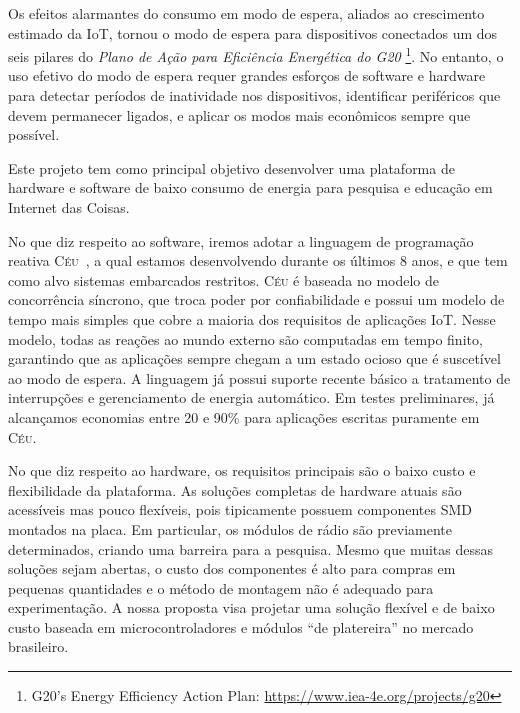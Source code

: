 \documentclass[titlepage,12pt]{article}
\newcommand{\CEU}{\textsc{C\'{e}u}\xspace}
\begin{document}
Os efeitos alarmantes do consumo em modo de espera, aliados ao crescimento
estimado da IoT, tornou o modo de espera para dispositivos conectados um dos
seis pilares do \emph{Plano de Ação para Eficiência Energética do G20}%
\footnote{G20's Energy Efficiency Action Plan: \url{https://www.iea-4e.org/projects/g20}}.
No entanto, o uso efetivo do modo de espera requer grandes esforços de software
e hardware para detectar períodos de inatividade nos dispositivos, identificar
periféricos que devem permanecer ligados, e aplicar os modos mais econômicos
sempre que possível.

Este projeto tem como principal objetivo desenvolver uma plataforma de hardware
e software de baixo consumo de energia para pesquisa e educação em Internet das
Coisas.

No que diz respeito ao software, iremos adotar a linguagem de programação
reativa \CEU~\cite{ceu.sensys13}, a qual estamos desenvolvendo durante os
últimos 8 anos, e que tem como alvo sistemas embarcados restritos.
%
\CEU é baseada no modelo de concorrência síncrono, que troca poder por
confiabilidade e possui um modelo de tempo mais simples que cobre a maioria dos
requisitos de aplicações IoT.
%
Nesse modelo, todas as reações ao mundo externo são computadas em tempo finito,
garantindo que as aplicações sempre chegam a um estado ocioso que é suscetível
ao modo de espera.
%
A linguagem já possui suporte recente básico a tratamento de interrupções e
gerenciamento de energia automático.
Em testes preliminares, já alcançamos economias entre 20 e 90\% para aplicações
escritas puramente em \CEU.

No que diz respeito ao hardware, os requisitos principais são o baixo custo e
flexibilidade da plataforma.
%
As soluções completas de hardware atuais são acessíveis mas pouco flexíveis,
pois tipicamente possuem componentes SMD montados na placa.
Em particular, os módulos de rádio são previamente determinados, criando uma
barreira para a pesquisa.
Mesmo que muitas dessas soluções sejam abertas, o custo dos componentes é alto
para compras em pequenas quantidades e o método de montagem não é adequado para
experimentação.
%
A nossa proposta visa projetar uma solução flexível e de baixo custo baseada em
microcontroladores e módulos ``de platereira'' no mercado brasileiro.

\end{document}
